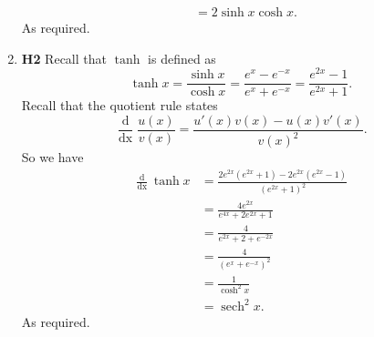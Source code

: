 \documentclass[12pt,oneside]{book}
\DeclareMathOperator{\sech}{sech}
\begin{document}
\begin{enumerate}
\begin{align*}
            &= 2 \sinh x \cosh x.
        \end{align*}
        As required.
        \item \textbf{H2} Recall that $\tanh$ is defined as \[
            \tanh x = \frac{\sinh x}{\cosh x} = \frac{e^x - e^{-x}}{e^x + e^{-x}} = \frac{e^{2x} - 1}{e^{2x} + 1} 
        .\] Recall that the quotient rule states \[
            \frac{\mathop{\mathrm{d}}}{\mathop{\mathrm{d}x}} \frac{u(x)}{v(x)} = \frac{u'(x) v(x) - u(x)v'(x)}{v(x)^2}
        .\] So we have \begin{align*}
            \frac{\mathop{\mathrm{d}}}{\mathop{\mathrm{d}x}} \tanh x &= \frac{2e^{2x}(e^{2x} + 1) - 2e^{2x}(e^{2x} - 1)}{(e^{2x} + 1)^2} \\
            &= \frac{4e^{2x}}{e^{4x} + 2e^{2x} + 1} \\
            &= \frac{4}{e^{2x} + 2 + e^{-2x}} \\
            &= \frac{4}{(e^x + e^{-x})^2} \\
            &= \frac{1}{\cosh^2 x} \\
            &= \sech^2 x.
        \end{align*}
        As required.
    \end{enumerate}
    
\end{document}
